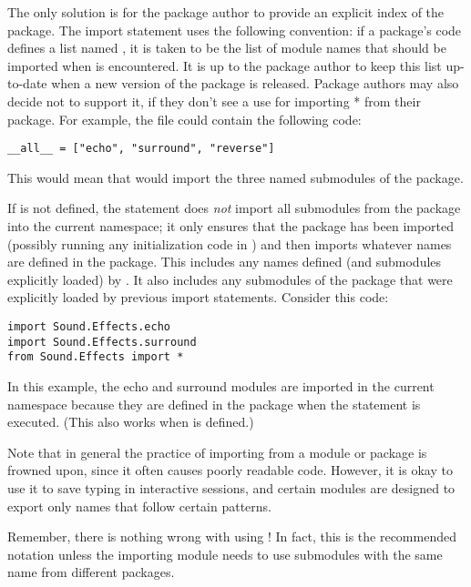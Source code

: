 \documentclass{manual}
\begin{document}
The only solution is for the package author to provide an explicit
index of the package.  The import statement uses the following
convention: if a package's  code defines a list
named , it is taken to be the list of module names that
should be imported when  is
encountered.  It is up to the package author to keep this list
up-to-date when a new version of the package is released.  Package
authors may also decide not to support it, if they don't see a use for
importing * from their package.  For example, the file
 could contain the following code:

\begin{verbatim}
__all__ = ["echo", "surround", "reverse"]
\end{verbatim}

This would mean that  would
import the three named submodules of the  package.

If  is not defined, the statement  does \emph{not} import all submodules from the package
 into the current namespace; it only ensures that the
package  has been imported (possibly running any
initialization code in ) and then imports whatever names are
defined in the package.  This includes any names defined (and
submodules explicitly loaded) by .  It also includes any
submodules of the package that were explicitly loaded by previous
import statements.  Consider this code:

\begin{verbatim}
import Sound.Effects.echo
import Sound.Effects.surround
from Sound.Effects import *
\end{verbatim}

In this example, the echo and surround modules are imported in the
current namespace because they are defined in the
 package when the  statement
is executed.  (This also works when  is defined.)

Note that in general the practice of importing \code{*} from a module or
package is frowned upon, since it often causes poorly readable code.
However, it is okay to use it to save typing in interactive sessions,
and certain modules are designed to export only names that follow
certain patterns.

Remember, there is nothing wrong with using !  In fact, this is the
recommended notation unless the importing module needs to use
submodules with the same name from different packages.
\end{document}
